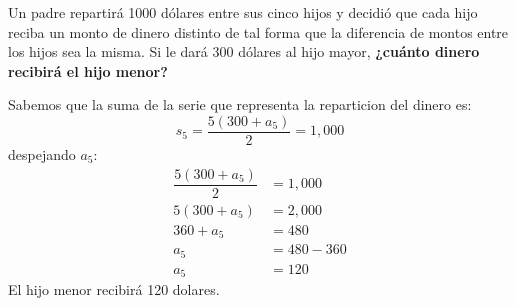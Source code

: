 Un padre repartirá 1000 dólares entre sus cinco hijos y decidió que cada hijo reciba un monto de dinero distinto de tal forma que la diferencia de montos entre los hijos sea la misma.
Si le dará 300 dólares al hijo mayor,
\textbf{¿cuánto dinero recibirá el hijo menor?}

\begin{solutionbox}{7cm}
    Sabemos que la suma de la serie que representa la reparticion del dinero es:
    \[s_{5}=\dfrac{5(300+a_{5})}{2}=1,000\]
    despejando $a_5$:
    \begin{align*}
        \dfrac{5(300+a_{5})}{2} & =1,000   \\
        5(300+a_{5})            & =2,000   \\
        360+a_{5}               & =480     \\
        a_{5}                   & =480-360 \\
        a_{5}                   & =120
    \end{align*}
    El hijo menor recibirá 120 dolares.
\end{solutionbox}